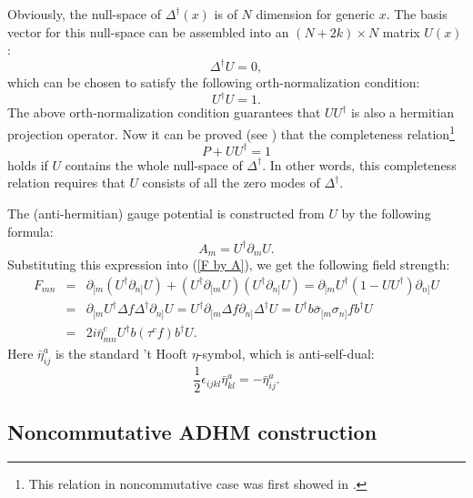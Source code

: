 \documentclass[a4paper,a4paper]{article}
\begin{document}
Obviously, the null-space of $\Delta^\dagger(x)$ is of $N$ dimension for
generic $x$. The basis vector for this null-space can be assembled into an $%
(N+2k)\times N$ matrix $U(x)$:
\begin{equation}
\Delta^\dag U=0,
\end{equation}
which can be chosen to satisfy the following orth-normalization condition:
\begin{equation}  \label{normal}
U^\dag U=1.
\end{equation}
The above orth-normalization condition guarantees that $UU^\dag$
is also a hermitian projection operator. Now it can be proved (see
\cite{TianZhu2}) that the completeness relation\footnote{This
relation in noncommutative case was first showed in
\cite{Paperb}.}
\begin{equation}  \label{complete}
P+UU^\dag=1
\end{equation}
holds if $U$ contains the whole null-space of $\Delta^\dagger$. In
other words, this completeness relation requires that $U$ consists
of all the zero modes of $\Delta^\dagger$.

The (anti-hermitian) gauge potential is constructed from $U$ by the
following formula:
\begin{equation}
A_m= U^\dag\partial_m U.
\end{equation}
Substituting this expression into (\ref{F by A}), we get the following field
strength:
\begin{eqnarray}
F_{mn}&=&\partial_{[m}(U^\dag\partial_{n]}U)
+(U^\dag\partial_{[m}U)(U^\dag\partial_{n]}U)
=\partial_{[m}U^\dag(1-UU^\dag)\partial_{n]}U  \nonumber \\
&=&\partial_{[m}U^\dag\Delta f\Delta^\dag\partial_{n]}U
=U^\dag\partial_{[m}\Delta f\partial_{n]}\Delta^\dag U =U^\dag
b\bar\sigma_{[m}\sigma_{n]}f b^\dag U  \nonumber \\
&=& 2i\bar\eta^c_{mn}U^\dag b(\tau^c f)b^\dag U.  \label{F by U}
\end{eqnarray}
Here $\bar\eta^a_{ij}$ is the standard 't Hooft $\eta$-symbol, which is
anti-self-dual:
\begin{equation}
\frac{1}{2}\epsilon_{ijkl}\bar\eta^a_{kl}=-\bar\eta^a_{ij}.
\end{equation}

\subsection{Noncommutative ADHM construction}
\end{document}
